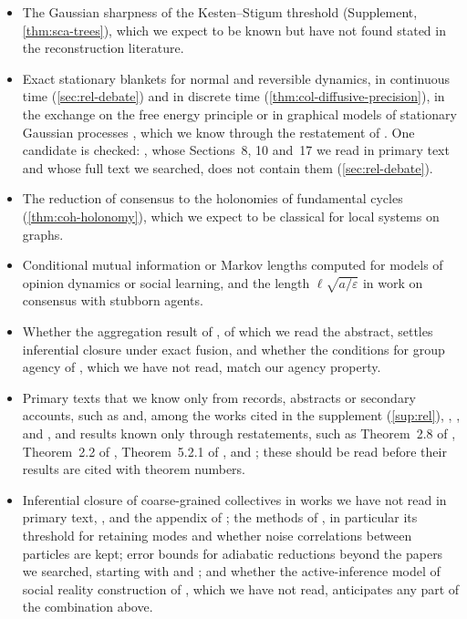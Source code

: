 \begin{itemize}
\item The Gaussian sharpness of the Kesten--Stigum threshold (Supplement, \cref{thm:sca-trees}), which we expect to be known but have not found stated in the reconstruction literature.
\item Exact stationary blankets for normal and reversible dynamics, in continuous time (\cref{sec:rel-debate}) and in discrete time (\cref{thm:col-diffusive-precision}), in the exchange on the free energy principle or in graphical models of stationary Gaussian processes \citep{dahlhaus2000graphical}, which we know through the restatement of \citet{eichler2006fitting}. One candidate is checked: \citet{sakthivadivel2026nonequilibrium}, whose Sections~8, 10 and~17 we read in primary text and whose full text we searched, does not contain them (\cref{sec:rel-debate}).
\item The reduction of consensus to the holonomies of fundamental cycles (\cref{thm:coh-holonomy}), which we expect to be classical for local systems on graphs.
\item Conditional mutual information or Markov lengths computed for models of opinion dynamics or social learning, and the length $\ell\sqrt{a/\varepsilon}$ in work on consensus with stubborn agents.
\item Whether the aggregation result of \citet{mossel2016efficient}, of which we read the abstract, settles inferential closure under exact fusion, and whether the conditions for group agency of \citet{list2011group}, which we have not read, match our agency property.
\item Primary texts that we know only from records, abstracts or secondary accounts, such as \citet{imry1975random} and, among the works cited in the supplement (\cref{sup:rel}), \citet{vonneumann1950functional}, \citet{halperin1962product}, \citet{degroot1974reaching} and \citet{marchioro1978velocity}, and results known only through restatements, such as Theorem~2.8 of \citet{monderer1996potential}, Theorem~2.2 of \citet{ney1966martin}, Theorem~5.2.1 of \citet{bakry2014analysis}, \citet{lyons1990random} and \citet{kayalar1988error}; these should be read before their results are cited with theorem numbers.
\item Inferential closure of coarse-grained collectives in works we have not read in primary text, \citet{hesp2019multi}, \citet{ramstead2021multiscale} and the appendix of \citet{rosas2024software}; the methods of \citet{friston2021parcels}, in particular its threshold for retaining modes and whether noise correlations between particles are kept; error bounds for adiabatic reductions beyond the papers we searched, starting with \citet{zaghw2026renormalising} and \citet{devries2026active}; and whether the active-inference model of social reality construction of \citet{nomura2026social}, which we have not read, anticipates any part of the combination above.

\end{itemize}

